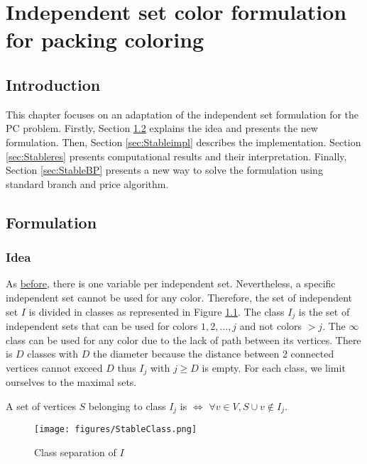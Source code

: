 \chapter{Independent set color formulation for packing coloring}

\section{Introduction}

This chapter focuses on an adaptation of the independent set formulation for the PC problem. Firstly, Section \ref{sec:Stableformu} explains the idea and presents the new formulation. Then, Section \ref{sec:Stableimpl} describes the implementation. Section \ref{sec:Stableres} presents computational results and their interpretation. Finally, Section \ref{sec:StableBP} presents a new way to solve the formulation using standard branch and price algorithm.

\section{Formulation}
\label{sec:Stableformu}

\subsection{Idea}
As \hyperref[IC]{before}, there is one variable per independent set. Nevertheless, a specific independent set cannot be used for any color. Therefore, the set of independent set $I$ is divided in classes as represented in Figure \ref{fig:classeI}. The class $I_j$ is the set of independent sets that can be used for colors $1,2,\dots,j$ and not colors $> j$. The $\infty$ class can be used for any color due to the lack of path between its vertices. There is $D$ classes with $D$ the diameter because the distance between 2 connected vertices cannot exceed $D$ thus $I_j$ with $j\geq D$ is empty. For each class, we limit ourselves to the maximal sets. \\

\begin{mydef}
	\label{def:stableMax}
	A set of vertices $S$ belonging to class $I_j$ is  $\iff$ $\forall v \in V, S \cup v \notin I_j$.
\end{mydef}

\begin{figure}[H]
  \centering
  \texttt{[image: figures/StableClass.png]}
  \caption{Class separation of $I$}
  \label{fig:classeI}
\end{figure}

